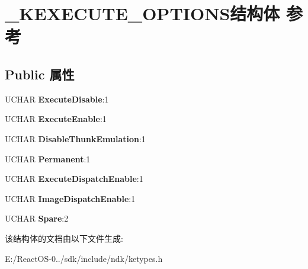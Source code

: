 \hypertarget{struct___k_e_x_e_c_u_t_e___o_p_t_i_o_n_s}{}\section{\+\_\+\+K\+E\+X\+E\+C\+U\+T\+E\+\_\+\+O\+P\+T\+I\+O\+N\+S结构体 参考}
\label{struct___k_e_x_e_c_u_t_e___o_p_t_i_o_n_s}
\subsection*{Public 属性}
\begin{DoxyCompactItemize}
\item 
\mbox{\label{struct___k_e_x_e_c_u_t_e___o_p_t_i_o_n_s_a10249a0dbbf7cd0b71f909460db78256}} 
U\+C\+H\+AR {\bfseries Execute\+Disable}\+:1
\item 
\mbox{\label{struct___k_e_x_e_c_u_t_e___o_p_t_i_o_n_s_a18089acab010aec2af0541c44370d607}} 
U\+C\+H\+AR {\bfseries Execute\+Enable}\+:1
\item 
\mbox{\label{struct___k_e_x_e_c_u_t_e___o_p_t_i_o_n_s_a046aa2b2fc834dde6387ed5b35d6a075}} 
U\+C\+H\+AR {\bfseries Disable\+Thunk\+Emulation}\+:1
\item 
\mbox{\label{struct___k_e_x_e_c_u_t_e___o_p_t_i_o_n_s_a3d59d90e6b3ca1394496e310bbc7e80a}} 
U\+C\+H\+AR {\bfseries Permanent}\+:1
\item 
\mbox{\label{struct___k_e_x_e_c_u_t_e___o_p_t_i_o_n_s_a4829c3aa778b9936c7ff2742d417aafc}} 
U\+C\+H\+AR {\bfseries Execute\+Dispatch\+Enable}\+:1
\item 
\mbox{\label{struct___k_e_x_e_c_u_t_e___o_p_t_i_o_n_s_a69c64a03774c6c36f9dd77cc49281a8d}} 
U\+C\+H\+AR {\bfseries Image\+Dispatch\+Enable}\+:1
\item 
\mbox{\label{struct___k_e_x_e_c_u_t_e___o_p_t_i_o_n_s_a7b4a7b6788de45b2fa462f4ad48d9208}} 
U\+C\+H\+AR {\bfseries Spare}\+:2
\end{DoxyCompactItemize}


该结构体的文档由以下文件生成\+:\begin{DoxyCompactItemize}
\item 
E\+:/\+React\+O\+S-\/0../sdk/include/ndk/ketypes.\+h\end{DoxyCompactItemize}
